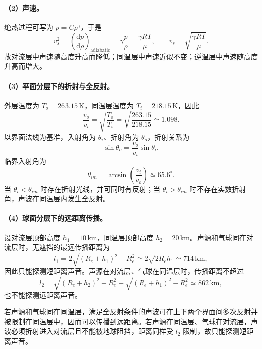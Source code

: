 \paragraph{（2）声速。}
绝热过程可写为 $p=C\rho^\gamma$，于是
\[
v_s^2=\left(\frac{\mathrm dp}{\mathrm d\rho}\right)_{\mathrm{adiabatic}}
=\gamma\frac{p}{\rho}=\frac{\gamma RT}{\mu},
\qquad
v_s=\sqrt{\frac{\gamma RT}{\mu}}.
\]
故对流层中声速随高度升高而降低；同温层中声速近似不变；逆温层中声速随高度升高而增大。

\paragraph{（3）平面分层下的折射与全反射。}
外层温度为 $T_o=263.15\,\mathrm K$，同温层温度为 $T_i=218.15\,\mathrm K$，因此
\[
\frac{v_o}{v_i}=\sqrt{\frac{T_o}{T_i}}
=\sqrt{\frac{263.15}{218.15}}\simeq1.098.
\]
以界面法线为基准，入射角为 $\theta_i$、折射角为 $\theta_o$，折射关系为
\[
\sin\theta_o=\frac{v_o}{v_i}\sin\theta_i.
\]
临界入射角为
\[
\theta_{im}=\arcsin\!\left(\frac{v_i}{v_o}\right)
\simeq65.6^\circ.
\]
当 $\theta_i<\theta_{im}$ 时存在折射光线，并可同时有反射；当 $\theta_i>\theta_{im}$ 时不存在实数折射角，声波在同温层内发生全反射。

\paragraph{（4）球面分层下的远距离传播。}
设对流层顶部高度 $h_1=10\,\mathrm{km}$，同温层顶部高度 $h_2=20\,\mathrm{km}$。声源和气球同在对流层时，无遮挡的最远传播距离为
\[
l_1=2\sqrt{(R_e+h_1)^2-R_e^2}
\simeq2\sqrt{2R_eh_1}\simeq714\,\mathrm{km},
\]
因此只能探测短距离声音。声源在对流层、气球在同温层时，传播距离不超过
\[
l_2=\sqrt{(R_e+h_2)^2-R_e^2}
+\sqrt{(R_e+h_1)^2-R_e^2}
\simeq862\,\mathrm{km},
\]
也不能探测远距离声音。

若声源和气球同在同温层，满足全反射条件的声波可在上下两个界面间多次反射并被限制在同温层中，因而可以传播到远距离。若声源在同温层、气球在对流层，声波必须折射进入对流层且不能被地球阻挡，距离同样受 $l_2$ 限制，故只能探测短距离声音。
